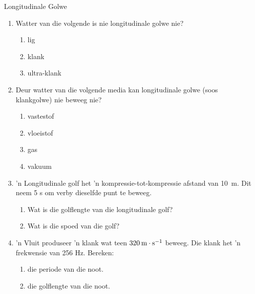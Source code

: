    \label{m38783*cid9}


\begin{eocexercises}{Longitudinale Golwe}
            \nopagebreak
\label{m38783*id293753}\begin{enumerate}[noitemsep, label=\textbf{\arabic*}. ] 
\item Watter van die volgende is nie longitudinale golwe nie?
\begin{enumerate}[noitemsep, label=\textbf{\alph*}. ] 
    \item lig
    \item klank
    \item ultra-klank
\end{enumerate}
\item Deur watter van die volgende media kan longitudinale golwe (soos klankgolwe) nie beweeg nie?
\begin{enumerate}[noitemsep, label=\textbf{\alph*}. ] 
    \item vastestof
    \item vloeistof
    \item gas
    \item vakuum
\end{enumerate}

\par
\item 'n Longitudinale golf het 'n kompressie-tot-kompressie afstand van 10~m. Dit neem 5 s om verby dieselfde punt te beweeg.
\begin{enumerate}[noitemsep, label=\textbf{\alph*}. ] 
    \item Wat is die golflengte van die longitudinale golf?
    \item Wat is die spoed van die golf?
\end{enumerate}

\item 'n Vluit produseer 'n klank wat teen $320\phantom{\rule{2pt}{0ex}}\text{m}\ensuremath{\cdot}\text{s}{}^{-1}$ beweeg. Die klank het 'n frekwensie van 256 Hz. Bereken:
\begin{enumerate}[noitemsep, label=\textbf{\alph*}. ] 
    \item die periode van die noot.
    \item die golflengte van die noot.
\end{enumerate}
\end{enumerate}


\end{eocexercises}
